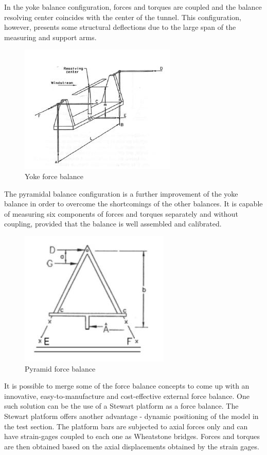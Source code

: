 In the yoke balance configuration, forces and torques are coupled and the balance resolving center coincides with the center of the tunnel. This configuration, however, presents some structural deflections due to the large span of the measuring and support arms.
\begin{center}
	\begin{figure}[H]
	\centering
	\includegraphics{Figures/Yoke}
	\caption[Yoke force balance]{Yoke force balance \cite{ferreira2015design}}
	\end{figure}
\end{center}
The pyramidal balance configuration is a further improvement of the yoke balance in order to overcome the shortcomings of the other balances. It is capable of measuring six components of forces and
torques separately and without coupling, provided that the balance is well assembled and calibrated.
\begin{center}
	\begin{figure}[H]
	\centering
	\includegraphics{Figures/Pyramid}
	\caption[Pyramid force balance]{Pyramid force balance \cite{ferreira2015design}}
	\end{figure}
\end{center}
It is possible to merge some of the force balance concepts to come up with an innovative, easy-to-manufacture and cost-effective external force balance. One such solution can be the use of a Stewart platform as a force balance. The Stewart platform offers another advantage - dynamic positioning of the model in the test section.
The platform bars are subjected to axial forces only and can have strain-gages coupled to each one as Wheatstone bridges. Forces and torques are then obtained based on the axial displacements obtained by the strain gages\cite{fernandes_design_nodate}.

